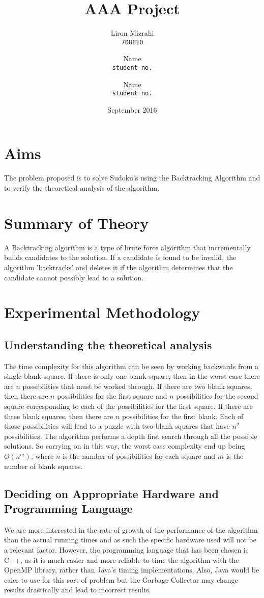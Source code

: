 \documentclass{article}
\title{AAA Project}
\date{September 2016}
\author{
  Liron Mizrahi\\
  \texttt{708810}
  \and
  Name\\
  \texttt{student no.}
  \and
  Name\\
  \texttt{student no.}
}
\begin{document}
\maketitle

\section{Aims}
The problem proposed is to solve Sudoku's using the Backtracking Algorithm and to verify the theoretical analysis of the algorithm.

\section{Summary of Theory}
A Backtracking algorithm is a type of brute force algorithm that incrementally builds candidates to the solution. If a candidate is found to be invalid, the algorithm 'backtracks' and deletes it if the algorithm determines that the candidate cannot possibly lead to a solution.

\section{Experimental Methodology}
\subsection{Understanding the theoretical analysis}
The time complexity for this algorithm can be seen by working backwards from a single blank square. If there is only one blank square, then in the worst case there are $n$ possibilities that must be worked through. If there are two blank squares, then there are $n$ possibilities for the first square and $n$ possibilities for the second square corresponding to each of the possibilities for the first square. If there are three blank squares, then there are $n$ possibilities for the first blank. Each of those possibilities will lead to a puzzle with two blank squares that have $n^2$ possibilities.
The algorithm performs a depth first search through all the possible solutions. So carrying on in this way, the worst case complexity end up being $O(n^m)$, where $n$ is the number of possibilities for each square and $m$ is the number of blank squares.

\subsection{Deciding on Appropriate Hardware and Programming Language}
We are more interested in the rate of growth of the performance of the algorithm than the actual running times and as such the specific hardware used will not be a relevant factor. However, the programming language that has been chosen is C++, as it is much easier and more reliable to time the algorithm with the OpenMP library, rather than Java's timing implementations. Also, Java would be eaier to use for this sort of problem but the Garbage Collector may change results drastically and lead to incorrect results.
\end{document}
